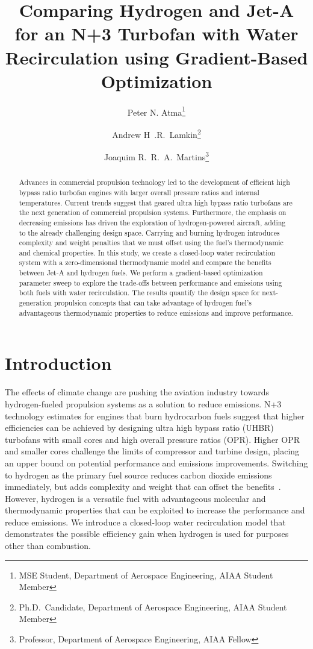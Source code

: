 \documentclass[conf]{new-aiaa}
\title{Comparing Hydrogen and Jet-A for an N+3 Turbofan with Water Recirculation using Gradient-Based Optimization} %
\author{Peter N. Atma\footnote{MSE Student, Department of Aerospace Engineering, AIAA Student Member}}
\author{Andrew H~.R.~Lamkin\footnote{Ph.D.~Candidate, Department of Aerospace Engineering, AIAA Student Member}}
\author{Joaquim R.~R.~A.~Martins\footnote{Professor, Department of Aerospace Engineering, AIAA Fellow}}
\affil{University of Michigan, Ann Arbor, MI, 48109}
\begin{document}
\maketitle

\begin{abstract}
  Advances in commercial propulsion technology led to the development of efficient high bypass ratio turbofan engines with larger overall pressure ratios and internal temperatures.
  Current trends suggest that geared ultra high bypass ratio turbofans are the next generation of commercial propulsion systems.
  Furthermore, the emphasis on decreasing emissions has driven the exploration of hydrogen-powered aircraft, adding to the already challenging design space.
  Carrying and burning hydrogen introduces complexity and weight penalties that we must offset using the fuel's thermodynamic and chemical properties.
  In this study, we create a closed-loop water recirculation system with a zero-dimensional thermodynamic model and compare the benefits between Jet-A and hydrogen fuels.
  We perform a gradient-based optimization parameter sweep to explore the trade-offs between performance and emissions using both fuels with water recirculation.
  The results quantify the design space for next-generation propulsion concepts that can take advantage of hydrogen fuel's advantageous thermodynamic properties to reduce emissions and improve performance.
\end{abstract}

\section{Introduction}
The effects of climate change are pushing the aviation industry towards hydrogen-fueled propulsion systems as a solution to reduce emissions.
N+3 technology estimates for engines that burn hydrocarbon fuels suggest that higher efficiencies can be achieved by designing ultra high bypass ratio (UHBR) turbofans with small cores and high overall pressure ratios (OPR).
Higher OPR and smaller cores challenge the limits of compressor and turbine design, placing an upper bound on potential performance and emissions improvements.
Switching to hydrogen as the primary fuel source reduces carbon dioxide emissions immediately, but adds complexity and weight that can offset the benefits~\cite{Adler2023}.
However, hydrogen is a versatile fuel with advantageous molecular and thermodynamic properties that can be exploited to increase the performance and reduce emissions.
We introduce a closed-loop water recirculation model that demonstrates the possible efficiency gain when hydrogen is used for purposes other than combustion.
\end{document}
